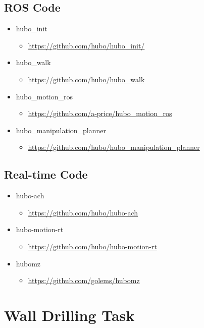 \documentclass[letterpaper, 10 pt]{report}
\begin{document}
\subsection*{ROS Code}
\begin{itemize}
\item hubo\_init
	\begin{itemize}
	\item \url{https://github.com/hubo/hubo\_init/}
	\end{itemize}
\item hubo\_walk
	\begin{itemize}
	\item \url{https://github.com/hubo/hubo\_walk}
	\end{itemize}
\item hubo\_motion\_ros
	\begin{itemize}
	\item \url{https://github.com/a-price/hubo\_motion\_ros}
	\end{itemize}
\item hubo\_manipulation\_planner
	\begin{itemize}
	\item \url{https://github.com/hubo/hubo\_manipulation\_planner}
	\end{itemize}
\end{itemize}
\subsection*{Real-time Code}
\begin{itemize}
\item hubo-ach
	\begin{itemize}
	\item \url{https://github.com/hubo/hubo-ach}
	\end{itemize}
\item hubo-motion-rt
	\begin{itemize}
	\item \url{https://github.com/hubo/hubo-motion-rt}
	\end{itemize}
\item hubomz
	\begin{itemize}
	\item \url{https://github.com/golems/hubomz}
	\end{itemize}
\end{itemize}

\newpage
\section*{Wall Drilling Task}
\end{document}
